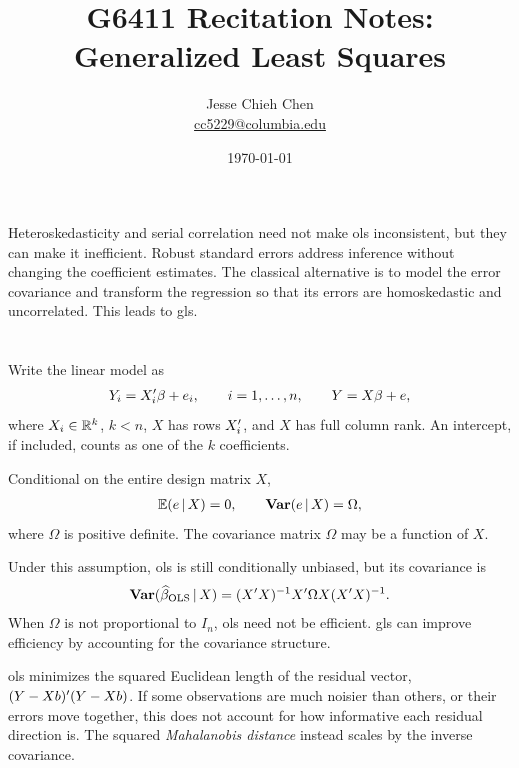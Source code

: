 \documentclass[a4paper,12pt]{article}
\title{G6411 Recitation Notes: Generalized Least Squares}
\author{Jesse Chieh Chen\\\href{mailto:cc5229@columbia.edu}{cc5229@columbia.edu}}
\date{\today}
\begin{document}
\maketitle

\noindent
Heteroskedasticity and serial correlation need not make \gls{ols} inconsistent,
but they can make it inefficient.
Robust standard errors address inference without changing the coefficient estimates.
The classical alternative is to model the error covariance and transform the regression
so that its errors are homoskedastic and uncorrelated.
This leads to \gls{gls}.

\section{}

Write the linear model as
\begin{align}
    Y_i=X_i^{\prime}\beta+e_i,\qquad i=1,\ldots,n,
    \qquad Y=X\beta+e,
\end{align}
where $X_i\in\mathbb{R}^k$, $k<n$, $X$ has rows $X_i^{\prime}$, and $X$ has full column rank.
An intercept, if included, counts as one of the $k$ coefficients.

\begin{assumption}\label{ass-gls}
    Conditional on the entire design matrix $X$,
    \begin{align}
        \operatorname{\mathbb{E}}(e\mathpunct{}|\mathpunct{} X)=0,\qquad
        \operatorname{\text{\textrm{\upshape\textbf{Var}}}}(e\mathpunct{}|\mathpunct{} X)=\Omega,
    \end{align}
    where $\Omega$ is positive definite.
    The covariance matrix $\Omega$ may be a function of $X$.
\end{assumption}

\begin{remark}
	Under this assumption, \gls{ols} is still conditionally unbiased, but its covariance is
	\begin{align}
		\operatorname{\text{\textrm{\upshape\textbf{Var}}}}(\widehat\beta_{\mathrm{OLS}}\mathpunct{}|\mathpunct{} X)
		=(X^{\prime} X)^{-1} X^{\prime}\Omega X(X^{\prime} X)^{-1}.
	\end{align}
	When $\Omega$ is not proportional to $I_n$, \gls{ols} need not be efficient.
	\Gls{gls} can improve efficiency by accounting for the covariance structure.
\end{remark}

\begin{remark}
	\Gls{ols} minimizes the squared Euclidean length of the residual vector,
	$(Y-Xb)^{\prime}(Y-Xb)$.
	If some observations are much noisier than others, or their errors move together,
	this does not account for how informative each residual direction is.
	The squared \emph{Mahalanobis distance} instead scales by the inverse covariance.
\end{remark}
\end{document}
